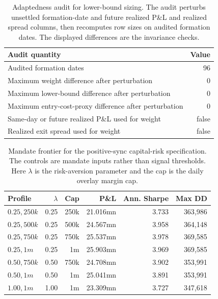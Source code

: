 \documentclass[11pt,a4paper]{amsart}
\newcommand{\tablecaptionskip}{\vspace{0.18em}}
\theoremstyle{plain}
\theoremstyle{definition}
\theoremstyle{remark}
\begin{document}
\begin{table}[H]
\centering
\caption{Adaptedness audit for lower-bound sizing.  The audit perturbs unsettled formation-date
and future realized P\&L and realized spread columns, then recomputes row sizes on audited
formation dates.  The displayed differences are the invariance checks.}
\tablecaptionskip
\begin{tabular}{lr}
\toprule
Audit quantity & Value\\
\midrule
Audited formation dates & 96\\
Maximum weight difference after perturbation & 0\\
Maximum lower-bound difference after perturbation & 0\\
Maximum entry-cost-proxy difference after perturbation & 0\\
Same-day or future realized P\&L used for weight & false\\
Realized exit spread used for weight & false\\
\bottomrule
\end{tabular}
\label{tab:app-leakage-audit}
\end{table}

\begin{table}[H]
\centering
\caption{Mandate frontier for the positive-sync capital-risk specification.  The controls are mandate
inputs rather than signal thresholds.  Here \(\lambda\) is the risk-aversion parameter and the cap
is the daily overlay margin cap.}
\tablecaptionskip
\begin{tabular}{lrrrrr}
\toprule
Profile & \(\lambda\) & Cap & P\&L & Ann. Sharpe & Max DD\\
\midrule
\(0.25,250k\) & 0.25 & 250k & 21.016mn & 3.733 & 363,986\\
\(0.25,500k\) & 0.25 & 500k & 24.567mn & 3.958 & 364,148\\
\(0.25,750k\) & 0.25 & 750k & 25.537mn & 3.978 & 369,585\\
\(0.25,1m\) & 0.25 & 1m & 25.903mn & 3.969 & 369,585\\
\(0.50,750k\) & 0.50 & 750k & 24.708mn & 3.902 & 353,991\\
\(0.50,1m\) & 0.50 & 1m & 25.041mn & 3.891 & 353,991\\
\(1.00,1m\) & 1.00 & 1m & 23.309mn & 3.727 & 347,618\\
\bottomrule
\end{tabular}
\label{tab:app-mandate-frontier}
\end{table}
\end{document}
